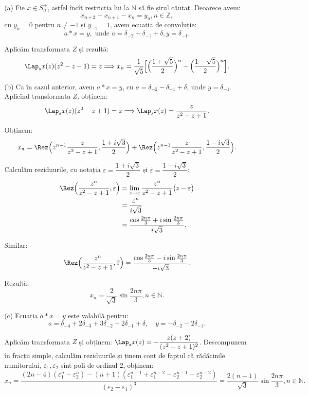 (a) Fie $x \in S_d^+$, astfel încît restricția lui la $\mathbb{N}$ să fie șirul 
căutat. Deoarece avem: 
\[
  x_{n+2} - x_{n+1} - x_n = y_n, n \in \mathbb{Z},
\]
cu $y_n = 0$ pentru $n \neq -1$ și $y_{-1} = 1$, avem ecuația de convoluție: 
\[
  a \ast x = y, \text{ unde } a 
  = \delta_{-2} + \delta_{-1} + \delta, y = \delta_{-1}.
\]

Aplicăm transformata $Z$ și rezultă: 
\[
  \Lap_s x(z) (z^2 - z - 1) = z \Longrightarrow x_n 
  = \dfrac{1}{\sqrt{5}} \Big[ \Big( \dfrac{1 + \sqrt{5}}{2} \Big)^n - 
  \Big( \dfrac{1 - \sqrt{5}}{2} \Big)^n \Big].
\]

(b) Ca în cazul anterior, avem $a \ast x = y$, cu 
$a = \delta_{-2} - \delta_{-1} + \delta$, unde $y = \delta_{-1}$. Aplicînd 
transformata $Z$, obținem: 
\[
  \Lap_s x(z) (z^2 - z + 1) = z \Longrightarrow \Lap_s x(z) 
  = \dfrac{z}{z^2 - z + 1}.
\]

Obținem:
\[
  x_n = \Rez \Big( z^{n-1} \dfrac{z}{z^2 - z + 1}, 
  \dfrac{1 + i \sqrt{3}}{2} \Big) + \Rez \Big( z^{n-1} \dfrac{z}{z^2 - z + 1}, 
  \dfrac{1 - i \sqrt{3}}{2} \Big).
\]

Calculăm reziduurile, cu notația $\varepsilon = \dfrac{1 + i \sqrt{3}}{2}$ și 
$\overline{\varepsilon} = \dfrac{1 - i \sqrt{3}}{2}$:
\begin{align*}
  \Rez \Big( \dfrac{z^n}{z^2 - z + 1}, \varepsilon \Big) 
  &= \lim_{z \to \varepsilon} \dfrac{z^n}{z^2 - z + 1} 
    \big( z - \varepsilon \big) \\
  &= \dfrac{\varepsilon^n}{i \sqrt{3}} \\
  &= \dfrac{\cos \frac{2 n \pi}{3} + i \sin \frac{2 n \pi}{3}}{i \sqrt{3}}.
\end{align*}

Similar: 
\[
  \Rez \Big( \dfrac{z^n}{z^2 - z + 1}, \overline{\varepsilon} \Big) 
  = \dfrac{\cos \frac{2n\pi}{3} - i \sin \frac{2 n \pi}{3}}{-i\sqrt{3}}.
\]

Rezultă: 
\[
  x_n = \dfrac{2}{\sqrt{3}} \sin \dfrac{2n\pi}{3}, n \in \mathbb{N}.
\]

(c) Ecuația $a \ast x = y$ este valabilă pentru: 
\[
  a = \delta_{-4} + 2 \delta_{-3} + 3 \delta_{-2} + 2 \delta_{-1} + \delta, 
  \quad y = -\delta_{-2} - 2 \delta_{-1}.
\]

Aplicăm transformata $Z$ și obținem: 
$\Lap_s x(z) = - \dfrac{z(z+2)}{(z^2 + z + 1)^2}$. Descompunem în fracții 
simple, calculăm reziduurile și ținem cont de faptul că rădăcinile numitorului, 
$\varepsilon_1, \varepsilon_2$ sînt poli de ordinul 2, obținem: 
\[
  x_n = \dfrac{(2n-4)(\varepsilon_1^n - \varepsilon_2^n) - 
    (n+1)(\varepsilon_1^{n-1} + \varepsilon_1^{n-2} - \varepsilon_2^{n-1} - 
    \varepsilon_2^{n-2})}{(\varepsilon_2 - \varepsilon_1)^3} 
  = \dfrac{2(n-1)}{\sqrt{3}} \sin \dfrac{2 n \pi}{3}, n \in \mathbb{N}.
\]

